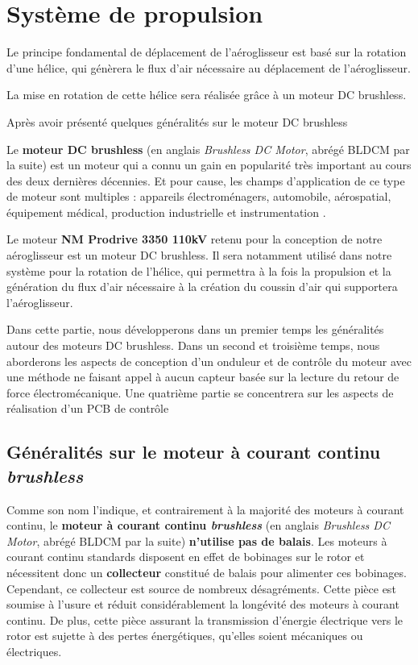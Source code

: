 	\chapter{Système de propulsion}

	Le principe fondamental de déplacement de l'aéroglisseur est basé sur la rotation d'une hélice, qui génèrera le flux d'air nécessaire au déplacement de l'aéroglisseur.
	
	La mise en rotation de cette hélice sera réalisée grâce à un moteur DC brushless. 
	
	Après avoir présenté quelques généralités sur le moteur DC  brushless
		
	Le \textbf{moteur DC brushless} (en anglais \textit{Brushless DC Motor}, abrégé BLDCM par la suite) est un moteur qui a connu un gain en popularité très important au cours des deux dernières décennies. Et pour cause, les champs d'application de ce type de moteur sont multiples : appareils électroménagers, automobile, aérospatial, équipement médical, production industrielle et instrumentation \cite{AN885}. 
			
	Le moteur \textbf{NM Prodrive 3350 110kV} retenu pour la conception de notre aéroglisseur est un moteur DC brushless. Il sera notamment utilisé dans notre système pour la rotation de l'hélice, qui permettra à la fois la propulsion et la génération du flux d'air nécessaire à la création du coussin d'air qui supportera l'aéroglisseur.
			
	Dans cette partie, nous développerons dans un premier temps les généralités autour des moteurs DC brushless. Dans un second et troisième temps, nous aborderons les aspects de conception d'un onduleur et de contrôle du moteur avec une méthode ne faisant appel à aucun capteur basée sur la lecture du retour de force électromécanique. Une quatrième partie se concentrera sur les aspects de réalisation d'un PCB de contrôle 
			
		\section{Généralités sur le moteur à courant continu \textit{brushless}}
			
		Comme son nom l'indique, et contrairement à la majorité des moteurs à courant continu, le \textbf{moteur à courant continu \textit{brushless}} (en anglais \textit{Brushless DC Motor}, abrégé BLDCM par la suite) \textbf{n'utilise pas de balais}. Les moteurs à courant continu standards disposent en effet de bobinages sur le rotor et nécessitent donc un \textbf{collecteur} constitué de balais pour alimenter ces bobinages. Cependant, ce collecteur est source de nombreux désagréments. Cette pièce est soumise à l'usure et réduit considérablement la longévité des moteurs à courant continu. De plus, cette pièce assurant la transmission d'énergie électrique vers le rotor est sujette à des pertes énergétiques, qu'elles soient mécaniques ou électriques. 
		
